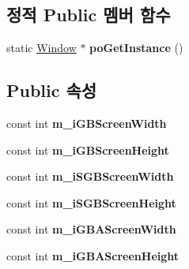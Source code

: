 \subsection*{정적 Public 멤버 함수}
\begin{DoxyCompactItemize}
\item 
\mbox{\label{class_v_b_a_1_1_window_a8e084a0514c78b2c93013c3fb9e2e6e9}} 
static \mbox{\hyperlink{class_v_b_a_1_1_window}{Window}} $\ast$ {\bfseries po\+Get\+Instance} ()
\end{DoxyCompactItemize}
\subsection*{Public 속성}
\begin{DoxyCompactItemize}
\item 
\mbox{\label{class_v_b_a_1_1_window_ab87ef83b1c563956f2ccb79f465e60a5}} 
const int {\bfseries m\+\_\+i\+G\+B\+Screen\+Width}
\item 
\mbox{\label{class_v_b_a_1_1_window_ad87b6a11eafd636e92c7a24af249af36}} 
const int {\bfseries m\+\_\+i\+G\+B\+Screen\+Height}
\item 
\mbox{\label{class_v_b_a_1_1_window_af01e947f6f9a8fce2de3df5f0420d066}} 
const int {\bfseries m\+\_\+i\+S\+G\+B\+Screen\+Width}
\item 
\mbox{\label{class_v_b_a_1_1_window_adc64e75d94960c2a9d0680465a838b5d}} 
const int {\bfseries m\+\_\+i\+S\+G\+B\+Screen\+Height}
\item 
\mbox{\label{class_v_b_a_1_1_window_a9a7257c8edba5383674c7a7eea250679}} 
const int {\bfseries m\+\_\+i\+G\+B\+A\+Screen\+Width}
\item 
\mbox{\label{class_v_b_a_1_1_window_a5029d02ff8ee7d81fa7e9ad210d537d6}} 
const int {\bfseries m\+\_\+i\+G\+B\+A\+Screen\+Height}
\end{DoxyCompactItemize}
